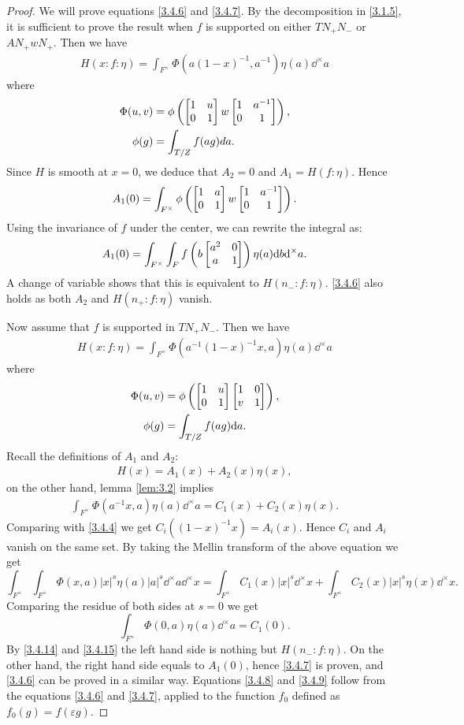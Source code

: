 \begin{proof}
We will prove equations \eqref{3.4.6} and \eqref{3.4.7}. By the decomposition in \eqref{3.1.5}, it is sufficient to prove the result when $f$ is supported on either $TN_+ N_-$ or $AN_{+}wN_{+}$.
Then we have
\begin{align}
    H(x:f:\eta) = \int_{F^\times} \Phi(a(1-x)^{-1}, a^{-1}) \eta(a) \dd^\times a
\end{align}
where
\begin{align}
    \Phi(u, v) &= \phi\left(\begin{bmatrix} 1 & u \\ 0 & 1 \end{bmatrix} w \begin{bmatrix} 1 & a^{-1} \\ 0 & 1 \end{bmatrix}\right), \\
    \phi(g) &= \int_{T/Z} f(ag) da.
\end{align}
Since $H$ is smooth at $x = 0$, we deduce that $A_2 = 0$ and $A_1 = H(f: \eta)$.
Hence
\[
A_1(0) = \int_{F^\times} \phi\left(\begin{bmatrix} 1 & a \\ 0 & 1 \end{bmatrix} w \begin{bmatrix} 1 & a^{-1} \\ 0 & 1 \end{bmatrix}\right).
\]
Using the invariance of $f$ under the center, we can rewrite the integral as:
\[
A_1(0) = \int_{F^\times} \int_{F} f\left(b \begin{bmatrix} a^2 & 0 \\ a & 1 \end{bmatrix}\right) \eta(a) \mathrm{d} b \mathrm{d}^\times a.
\]
A change of variable shows that this is equivalent to $H(n_-: f: \eta)$.
\eqref{3.4.6} also holds as both $A_2$ and $H(n_+:f:\eta)$ vanish.

Now assume that $f$ is supported in $TN_+ N_-$.
Then we have
\begin{align}
    H(x:f:\eta) = \int_{F^\times} \Phi(a^{-1}(1-x)^{-1}x, a) \eta(a) \dd^\times a
\end{align}
where
\begin{align}
    \Phi(u, v) &= \phi\left(\begin{bmatrix} 1 & u \\ 0 & 1 \end{bmatrix} \begin{bmatrix} 1 & 0 \\ v & 1 \end{bmatrix} \right), \label{3.4.14} \\
    \phi(g) &= \int_{T/Z} f(ag) \mathrm{d} a. \label{3.4.15}
\end{align}
Recall the definitions of $A_1$ and $A_2$:
\begin{align}
    H(x) = A_1(x) + A_2(x)\eta(x),
\end{align}
on the other hand, lemma \eqref{lem:3.2} implies
\begin{align}
    \int_{F^\times} \Phi(a^{-1} x, a) \eta(a) \dd^\times a = C_1(x) + C_2(x) \eta(x).
\end{align}
Comparing with \eqref{3.4.4} we get $C_i((1-x)^{-1}x) = A_i(x)$.
Hence $C_i$ and $A_i$ vanish on the same set.
By taking the Mellin transform of the above equation we get
\[
\int_{F^\times} \int_{F^\times} \Phi(x, a) |x|^{s} \eta(a) |a|^{s} \dd^\times a \dd^\times x = \int_{F^\times} C_1(x) |x|^{s} \dd^\times x + \int_{F^\times} C_2(x) |x|^{s} \eta(x) \dd^\times x.
\]
Comparing the residue of both sides at $s = 0$ we get
\[
\int_{F^\times} \Phi(0, a) \eta(a) \dd^\times a = C_1(0).
\]
By \eqref{3.4.14} and \eqref{3.4.15} the left hand side is nothing but $H(n_-:f:\eta)$.
On the other hand, the right hand side equals to $A_1(0)$, hence \eqref{3.4.7} is proven, and \eqref{3.4.6} can be proved in a similar way.
Equations \eqref{3.4.8} and \eqref{3.4.9} follow from the equations \eqref{3.4.6} and \eqref{3.4.7}, applied to the function $f_0$ defined as $f_0(g) = f(\varepsilon g)$.
\end{proof}
